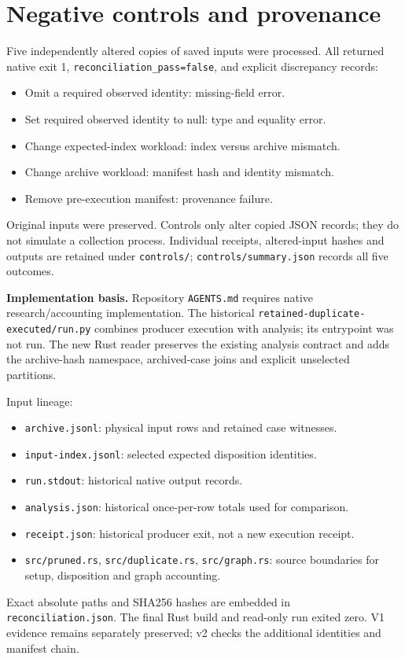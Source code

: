 \documentclass[11pt]{article}
\begin{document}
\section*{Negative controls and provenance}
Five independently altered copies of saved inputs were processed. All returned native exit 1, \texttt{reconciliation\_pass=false}, and explicit discrepancy records:
\begin{itemize}
\item Omit a required observed identity: missing-field error.
\item Set required observed identity to null: type and equality error.
\item Change expected-index workload: index versus archive mismatch.
\item Change archive workload: manifest hash and identity mismatch.
\item Remove pre-execution manifest: provenance failure.
\end{itemize}
Original inputs were preserved. Controls only alter copied JSON records; they do not simulate a collection process. Individual receipts, altered-input hashes and outputs are retained under \texttt{controls/}; \texttt{controls/summary.json} records all five outcomes.

\textbf{Implementation basis.} Repository \texttt{AGENTS.md} requires native research/accounting implementation. The historical \texttt{retained-duplicate-executed/run.py} combines producer execution with analysis; its entrypoint was not run. The new Rust reader preserves the existing analysis contract and adds the archive-hash namespace, archived-case joins and explicit unselected partitions.

Input lineage:
\begin{itemize}
\item \texttt{archive.jsonl}: physical input rows and retained case witnesses.
\item \texttt{input-index.jsonl}: selected expected disposition identities.
\item \texttt{run.stdout}: historical native output records.
\item \texttt{analysis.json}: historical once-per-row totals used for comparison.
\item \texttt{receipt.json}: historical producer exit, not a new execution receipt.
\item \texttt{src/pruned.rs}, \texttt{src/duplicate.rs}, \texttt{src/graph.rs}: source boundaries for setup, disposition and graph accounting.
\end{itemize}
Exact absolute paths and SHA256 hashes are embedded in \texttt{reconciliation.json}. The final Rust build and read-only run exited zero. V1 evidence remains separately preserved; v2 checks the additional identities and manifest chain.
\end{document}

